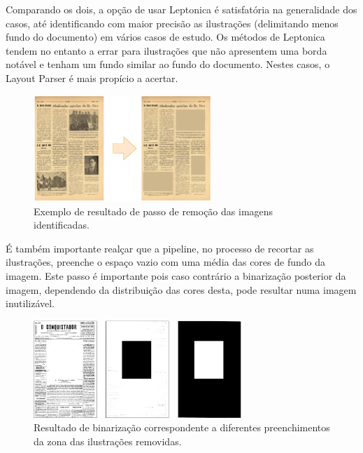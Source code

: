 Comparando os dois, a opção de usar Leptonica é satisfatória na generalidade dos casos, até identificando com maior precisão as ilustrações (delimitando menos fundo do documento) em vários casos de estudo. Os métodos de Leptonica tendem no entanto a errar para ilustrações que não apresentem uma borda notável e tenham um fundo similar ao fundo do documento. Nestes casos, o Layout Parser é mais propício a acertar.

\begin{figure}[H]
	\centering
	\includegraphics[width=0.6\textwidth]{images/ilustracoes/remove_images_example.png}
	\caption{Exemplo de resultado de passo de remoção das imagens identificadas.}
	\label{fig:remove_images_example}
\end{figure}



É também importante realçar que a pipeline, no processo de recortar as ilustrações, preenche o espaço vazio com uma média das cores de fundo da imagem. Este passo é importante pois caso contrário a binarização posterior da imagem, dependendo da distribuição das cores desta, pode resultar numa imagem inutilizável.

\begin{figure}[H]
	\centering
	\includegraphics[width=0.7\textwidth]{images/ilustracoes/binarize_remove_images_example.png}
	\caption{Resultado de binarização correspondente a diferentes preenchimentos da zona das ilustrações removidas.}
	\label{fig:binarize_remove_images_example}
\end{figure}

